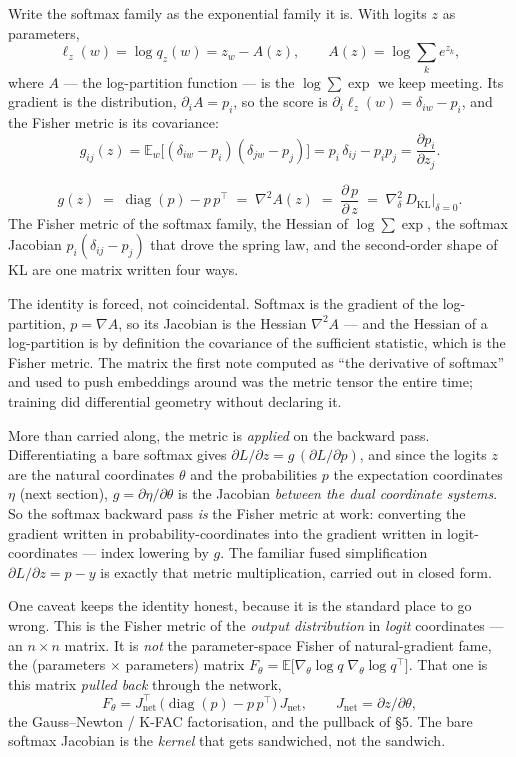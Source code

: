 \documentclass[11pt]{article}
\begin{document}
Write the softmax family as the exponential family it is. With logits $z$ as parameters,
\[
  \ell_z(w) = \log q_z(w) = z_w - A(z), \qquad A(z) = \log \textstyle\sum_k e^{z_k},
\]
where $A$ --- the log-partition function --- is the $\log\sum\exp$ we keep meeting. Its gradient
is the distribution, $\partial_i A = p_i$, so the score is $\partial_i \ell_z(w) = \delta_{iw} -
p_i$, and the Fisher metric is its covariance:
\[
  g_{ij}(z) = \mathbb{E}_w\!\bigl[(\delta_{iw}-p_i)(\delta_{jw}-p_j)\bigr]
  = p_i\,\delta_{ij} - p_i p_j
  = \frac{\partial p_i}{\partial z_j}.
\]
\begin{summary}
\[
  g(z) \;=\; \operatorname{diag}(p) - p\,p^{\top}
  \;=\; \nabla^2 A(z)
  \;=\; \frac{\partial\, p}{\partial\, z}
  \;=\; \nabla^2_{\!\delta}\, D_{\mathrm{KL}}\big|_{\delta=0}.
\]
The Fisher metric of the softmax family, the Hessian of $\log\sum\exp$, the softmax Jacobian
$p_i(\delta_{ij}-p_j)$ that drove the spring law, and the second-order shape of KL are one
matrix written four ways.
\end{summary}
The identity is forced, not coincidental. Softmax is the gradient of the log-partition,
$p = \nabla A$, so its Jacobian is the Hessian $\nabla^2 A$ --- and the Hessian of a
log-partition is by definition the covariance of the sufficient statistic, which is the Fisher
metric. The matrix the first note computed as ``the derivative of softmax'' and used to push
embeddings around was the metric tensor the entire time; training did differential geometry
without declaring it.

More than carried along, the metric is \emph{applied} on the backward pass. Differentiating a
bare softmax gives $\partial L/\partial z = g\,(\partial L/\partial p)$, and since the logits
$z$ are the natural coordinates $\theta$ and the probabilities $p$ the expectation coordinates
$\eta$ (next section), $g = \partial\eta/\partial\theta$ is the Jacobian \emph{between the dual
coordinate systems}. So the softmax backward pass \emph{is} the Fisher metric at work:
converting the gradient written in probability-coordinates into the gradient written in
logit-coordinates --- index lowering by $g$. The familiar fused simplification
$\partial L/\partial z = p - y$ is exactly that metric multiplication, carried out in closed
form.

\begin{insight}
One caveat keeps the identity honest, because it is the standard place to go wrong. This is
the Fisher metric of the \emph{output distribution} in \emph{logit} coordinates --- an
$n\times n$ matrix. It is \emph{not} the parameter-space Fisher of natural-gradient fame, the
(parameters $\times$ parameters) matrix $F_\theta = \mathbb{E}\!\bigl[\nabla_\theta \log q\;
\nabla_\theta \log q^{\top}\bigr]$. That one is this matrix \emph{pulled back} through the
network,
\[
  F_\theta = J_{\mathrm{net}}^{\top}\,\bigl(\operatorname{diag}(p) - p\,p^{\top}\bigr)\, J_{\mathrm{net}},
  \qquad J_{\mathrm{net}} = \partial z/\partial\theta,
\]
the Gauss--Newton / K-FAC factorisation, and the pullback of \S5. The bare softmax Jacobian is
the \emph{kernel} that gets sandwiched, not the sandwich.
\end{insight}
\end{document}
